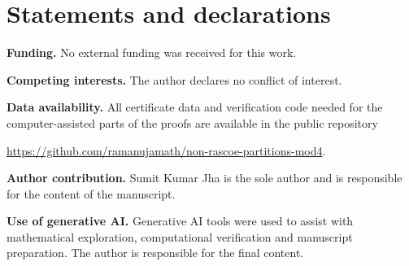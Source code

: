 \documentclass[11pt]{amsart}
\numberwithin{equation}{section}
\theoremstyle{plain}
\theoremstyle{definition}
\begin{document}
\appendix


\section*{Statements and declarations}
\noindent\textbf{Funding.} No external funding was received for this work.

\noindent\textbf{Competing interests.} The author declares no conflict of interest.

\noindent\textbf{Data availability.} All certificate data and verification code
needed for the computer-assisted parts of the proofs are available in the
public repository
\begin{center}
\url{https://github.com/ramanujamath/non-rascoe-partitions-mod4}.
\end{center}

\noindent\textbf{Author contribution.} Sumit Kumar Jha is the sole author and is
responsible for the content of the manuscript.

\noindent\textbf{Use of generative AI.} Generative AI tools were used to assist
with mathematical exploration, computational verification and manuscript
preparation. The author is responsible for the final content.


\end{document}
